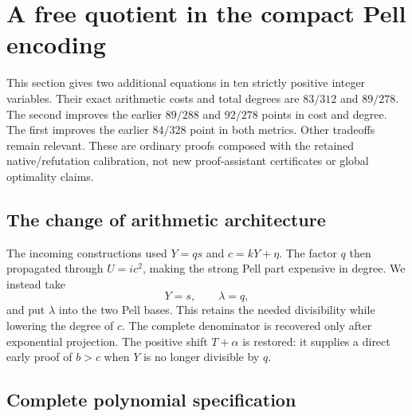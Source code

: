 \section{A free quotient in the compact Pell encoding}
\label{sec:free-quotient}

This section gives two additional equations in ten strictly positive
integer variables. Their exact arithmetic costs and total degrees are
\(83/312\) and \(89/278\). The second improves the earlier \(89/288\)
and \(92/278\) points in cost and degree. The first improves the earlier
\(84/328\) point in both metrics. Other tradeoffs remain relevant.
These are ordinary proofs composed with the retained native/refutation
calibration, not new proof-assistant certificates or global optimality
claims.

\subsection{The change of arithmetic architecture}

The incoming constructions used \(Y=qs\) and
\(c=kY+\eta\). The factor \(q\) then propagated through
\(U=ic^2\), making the strong Pell part expensive in degree.
We instead take
\[
 Y=s,\qquad \lambda=q,
\]
and put \(\lambda\) into the two Pell bases. This retains the
needed divisibility while lowering the degree of \(c\).
The complete denominator is recovered only after exponential projection.
The positive shift \(T+\alpha\) is restored: it supplies a direct
early proof of \(b>c\) when \(Y\) is no longer divisible by \(q\).

\subsection{Complete polynomial specification}


